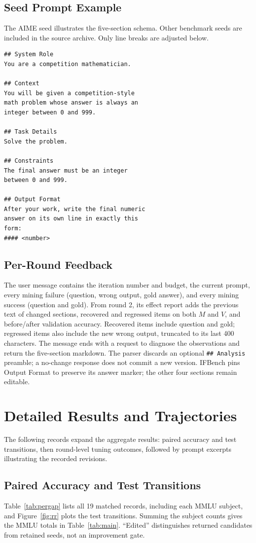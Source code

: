 \documentclass[11pt]{article}
\begin{document}
\subsection{Seed Prompt Example}
\label{app:seed}
The AIME seed illustrates the five-section schema. Other benchmark seeds are included in the source archive.
Only line breaks are adjusted below.
{\footnotesize
\begin{verbatim}
## System Role
You are a competition mathematician.

## Context
You will be given a competition-style
math problem whose answer is always an
integer between 0 and 999.

## Task Details
Solve the problem.

## Constraints
The final answer must be an integer
between 0 and 999.

## Output Format
After your work, write the final numeric
answer on its own line in exactly this
form:
#### <number>
\end{verbatim}
}

\subsection{Per-Round Feedback}
\label{app:feedback}
The user message contains the iteration number and budget, the current prompt, every mining failure (question, wrong
output, gold answer), and every mining success (question and gold). From round 2, its effect report adds the previous
text of changed sections, recovered and regressed items on both $M$ and $V$, and before/after validation accuracy.
Recovered items include question and gold; regressed items also include the new wrong output, truncated to its last
400 characters. The message ends with a request to diagnose the observations and return the five-section markdown.
The parser discards an optional \texttt{\#\# Analysis} preamble; a no-change response does not commit a new version.
IFBench pins Output Format to preserve its answer marker; the other four sections remain editable.

\FloatBarrier
\section{Detailed Results and Trajectories}
\label{app:results}
The following records expand the aggregate results: paired accuracy and test transitions, then round-level tuning
outcomes, followed by prompt excerpts illustrating the recorded revisions.

\subsection{Paired Accuracy and Test Transitions}
\label{app:gap}
Table~\ref{tab:pergap} lists all 19 matched records, including each MMLU subject, and Figure~\ref{fig:rr} plots the
test transitions. Summing the subject counts gives the MMLU totals in Table~\ref{tab:main}. ``Edited'' distinguishes
returned candidates from retained seeds, not an improvement gate.
\end{document}
